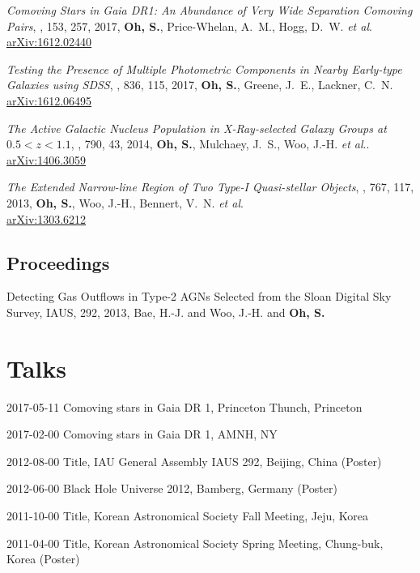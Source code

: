 \documentclass[11pt,letterpaper]{article}
\renewenvironment{itemize}{
  \begin{list}{}{
    \setlength{\leftmargin}{1.5em}
  }
}{
  \end{list}
}
\newcommand*\arxiv[1]{\href{https://arxiv.org/abs/#1}{arXiv:#1}}
\newcommand{\etal}{\textit{et al}.}
\begin{document}
\begin{etaremune}

  \item {\it Comoving Stars in Gaia DR1: An Abundance of Very Wide Separation Comoving Pairs},
    \aj, 153, 257, 2017, {{\bf {Oh}, S.}, {Price-Whelan}, A.~M., {Hogg}, D.~W. \etal}
    \arxiv{1612.02440}

  \item {\it Testing the Presence of Multiple Photometric Components in Nearby Early-type Galaxies using SDSS},
    \apj, 836, 115, 2017,
    {{\bf {Oh}, S.}, {Greene}, J.~E., {Lackner}, C.~N.}
		\arxiv{1612.06495}

  \item {\it The Active Galactic Nucleus Population in X-Ray-selected Galaxy Groups at $0.5 < z < 1.1$},
    \apj, 790, 43, 2014,
    {{\bf {Oh}, S.}, {Mulchaey}, J.~S., {Woo}, J.-H. \etal.}
		\arxiv{1406.3059}

	\item {\it The Extended Narrow-line Region of Two Type-I Quasi-stellar Objects},
    \apj, 767, 117, 2013,
    {{\bf {Oh}, S.}, {Woo}, J.-H., {Bennert}, V.~N. \etal}\\
    \arxiv{1303.6212}
\end{etaremune}

\subsection*{Proceedings}

\begin{etaremune}
  \item {Detecting Gas Outflows in Type-2 AGNs Selected from the Sloan Digital Sky Survey},
  IAUS, 292, 2013,
  {{Bae}, H.-J. and {Woo}, J.-H. and {\bf {Oh}, S.}}
\end{etaremune}

\section*{Talks}

\begin{itemize}
  \setlength\itemsep{0em}
  \item 2017-05-11 Comoving stars in Gaia DR 1, Princeton Thunch, Princeton
  \item 2017-02-00 Comoving stars in Gaia DR 1, AMNH, NY
  \item 2012-08-00 Title, IAU General Assembly IAUS 292, Beijing, China (Poster)
  \item 2012-06-00 Black Hole Universe 2012, Bamberg, Germany (Poster)
  \item 2011-10-00 Title, Korean Astronomical Society Fall Meeting, Jeju, Korea
  \item 2011-04-00 Title, Korean Astronomical Society Spring Meeting, Chung-buk, Korea (Poster)
\end{itemize}
\end{document}
